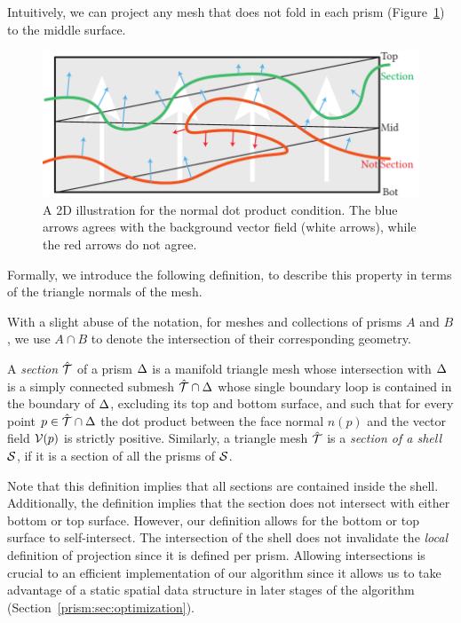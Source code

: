 %
Intuitively, we can project any mesh that does not fold in each prism (Figure~\ref{prism:fig:not_section}) to the middle surface.
\begin{figure}
    \centering
    \includegraphics[width=0.8\linewidth,draft=false]{prism-tex/figs/not-section-illustrate}
    \caption{A 2D illustration for the normal dot product condition. The blue arrows agrees with the background vector field (white arrows), while the red arrows do not agree.}
    \label{prism:fig:not_section}
    
\end{figure}
Formally, we introduce the following definition, to describe this property in terms of the triangle normals of the mesh.

With a slight abuse of the notation, for meshes and collections of prisms $A$ and $B$, we use $A \cap B $ to denote the intersection of their corresponding geometry.

\begin{definition}
\label{def:section}
A \emph{section} $\hat{\T}$ of a prism $\Prism$ is a manifold triangle mesh whose intersection with $\Prism$ is a simply connected submesh $\hat{\T} \cap \Prism$ whose single boundary loop is contained in the boundary of $\Prism$, excluding its top and bottom surface, and such that for every point $p \in \hat{\T} \cap \Prism$ the dot product
between the face normal $n(p)$ and the vector field $\V(p)$ is strictly positive. Similarly, a triangle mesh $\hat{\T}$ is a \emph{section of a shell $\S$}, if it is a section of all the prisms of $\S$.
\end{definition}
Note that this definition implies that all sections are contained inside the shell.
{Additionally, the definition implies that the section does not intersect with either bottom or top surface. 
However, our definition allows for the bottom or top surface to self-intersect. 
The intersection of the shell does not invalidate the \emph{local} definition of projection since it is defined per prism.
Allowing intersections is crucial to an efficient implementation of our algorithm since it allows us to take advantage of a static spatial data structure in later stages of the algorithm (Section~\ref{prism:sec:optimization}).
}

